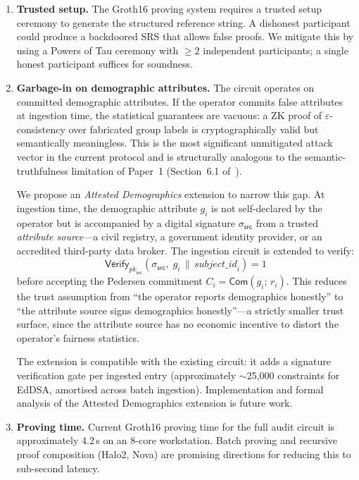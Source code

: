 \begin{enumerate}

  \item \textbf{Trusted setup.}
  The Groth16 proving system requires a trusted setup ceremony to generate
  the structured reference string. A dishonest participant could produce a
  backdoored SRS that allows false proofs. We mitigate this by using a
  Powers of Tau ceremony with $\geq 2$ independent participants; a single
  honest participant suffices for soundness.

  \item \textbf{Garbage-in on demographic attributes.}
  The circuit operates on committed demographic attributes. If
  the operator commits false attributes at ingestion time, the
  statistical guarantees are vacuous: a ZK proof of
  $\varepsilon$-consistency over fabricated group labels is
  cryptographically valid but semantically meaningless.
  This is the most significant unmitigated attack vector in the
  current protocol and is structurally analogous to the
  semantic-truthfulness limitation of Paper~1
  (Section~6.1 of~\cite{btv2026}).

  We propose an \emph{Attested Demographics} extension to narrow
  this gap. At ingestion time, the demographic attribute $g_i$ is
  not self-declared by the operator but is accompanied by a digital
  signature $\sigma_{\mathsf{src}}$ from a trusted \emph{attribute
  source}---a civil registry, a government identity provider, or an
  accredited third-party data broker. The ingestion circuit is
  extended to verify:
  \[
    \mathsf{Verify}_{\mathit{pk}_{\mathsf{src}}}(\sigma_{\mathsf{src}},\;
    g_i \,\|\, \mathit{subject\_id}_i) = 1
  \]
  before accepting the Pedersen commitment $C_i = \mathsf{Com}(g_i;\,
  r_i)$. This reduces the trust assumption from ``the operator
  reports demographics honestly'' to ``the attribute source signs
  demographics honestly''---a strictly smaller trust surface, since
  the attribute source has no economic incentive to distort the
  operator's fairness statistics.

  The extension is compatible with the existing circuit: it adds a
  signature verification gate per ingested entry (approximately
  $\sim$25{,}000 constraints for EdDSA, amortised across batch
  ingestion). Implementation and formal analysis of the Attested
  Demographics extension is future work.

  \item \textbf{Proving time.}
  Current Groth16 proving time for the full audit circuit is
  approximately 4.2\,s on an 8-core workstation. Batch proving and
  recursive proof composition (Halo2, Nova) are promising directions
  for reducing this to sub-second latency.

\end{enumerate}


